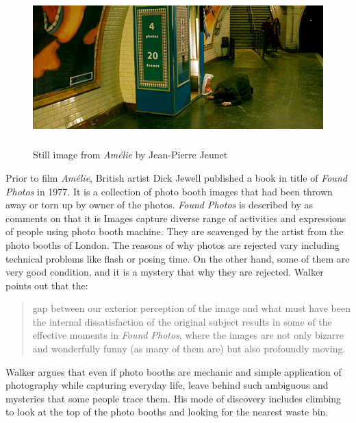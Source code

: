\begin{figure}[h!]
  \centering
  \includegraphics[height=6cm]{graphics/amelie_01.jpg}
  \caption{Still image from \textit{Amélie} by Jean-Pierre Jeunet}
  \label{fig:Amelie}
\end{figure}

Prior to film \textit{Amélie}, British artist Dick Jewell published a book in title of \textit{Found Photos} in 1977. It is a collection of photo booth images that had been thrown away or torn up by owner of the photos. \textit{Found Photos} is described by  \citet[222]{badger2014photobook} as  \cite{walker2010dick} comments on that it is  Images capture diverse range of activities and expressions of people using photo booth machine. They are scavenged by the artist from the photo booths of London. The reasons of why photos are rejected vary including technical problems like flash or posing time. On the other hand, some of them are very good condition, and it is a mystery that why they are rejected. Walker points out that the:

\begin{quote}
gap between our exterior perception of the image and what must have been the internal dissatisfaction of the original subject results in some of the effective moments in \textit{Found Photos}, where the images are not only bizarre and wonderfully funny (as many of them are) but also profoundly moving.
\end{quote}

Walker argues that even if photo booths are mechanic and simple application of photography while capturing everyday life, leave behind such ambiguous and mysteries that some people trace them.  His mode of discovery includes climbing to look at the top of the photo booths and looking for the nearest waste bin. 

